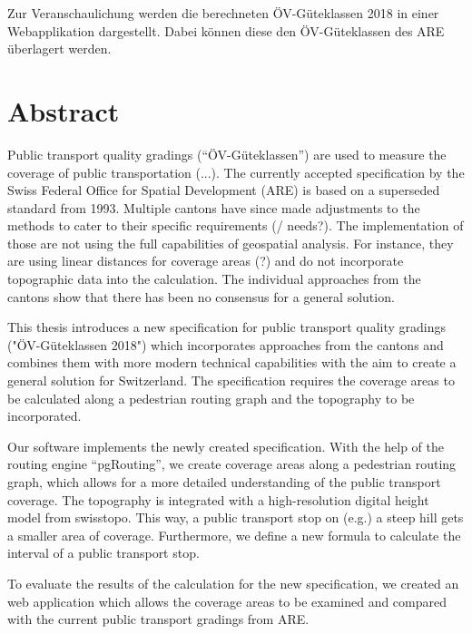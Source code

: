 Zur Veranschaulichung werden die berechneten ÖV-Güteklassen 2018 in einer
Webapplikation dargestellt.
Dabei können diese den ÖV-Güteklassen des ARE überlagert werden.


\cleardoublepage

\chapter*{Abstract}

Public transport quality gradings ("`ÖV-Güteklassen"') are used to measure the coverage of public transportation (...).
The currently accepted specification by the Swiss Federal Office for Spatial Development (ARE) is based on a superseded standard from 1993.
Multiple cantons have since made adjustments to the methods to cater to their specific requirements (/ needs?).
The implementation of those are not using the full capabilities of geospatial analysis.
For instance, they are using linear distances for coverage areas (?) and do not incorporate topographic data into the calculation.
The individual approaches from the cantons show that there has been no consensus for a general solution.

This thesis introduces a new specification for public transport quality gradings ("ÖV-Güteklassen 2018") which incorporates approaches from the cantons and combines them with more modern technical capabilities with the aim to create a general solution for Switzerland.
The specification requires the coverage areas to be calculated along a pedestrian routing graph and the topography to be incorporated.

Our software implements the newly created specification.
With the help of the routing engine "`pgRouting"', we create coverage areas along a pedestrian routing graph, which allows for a more detailed understanding of the public transport coverage.
The topography is integrated with a high-resolution digital height model from swisstopo.
This way, a public transport stop on (e.g.) a steep hill gets a smaller area of coverage.
Furthermore, we define a new formula to calculate the interval of a public transport stop.

To evaluate the results of the calculation for the new specification, we created an web application which allows the coverage areas to be examined and compared with the current public transport gradings from ARE.